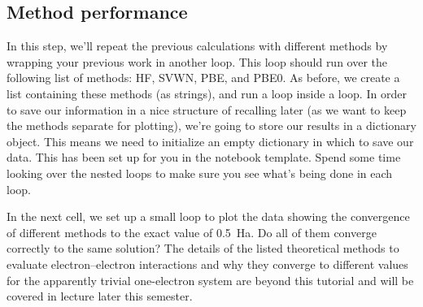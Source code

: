 \subsection*{Method performance}

In this step, we'll repeat the previous calculations with different methods by wrapping your previous work in another loop. This loop should run over the following list of methods: HF, SVWN, PBE, and PBE0. 
As before, we create a list containing these methods (as strings), and run a loop inside a loop. 
In order to save our information in a nice structure of recalling later (as we want to keep the methods separate for plotting), we're going to store our results in a dictionary object. 
This means we need to initialize an empty dictionary in which to save our data. This has been set up for you in the notebook template. 
Spend some time looking over the nested loops to make sure you see what's being done in each loop. 

In the next cell, we set up a small loop to plot the data showing the convergence of different methods to the exact value of \qty{0.5}{Ha}.
Do all of them converge correctly to the same solution? 
The details of the listed theoretical methods to evaluate electron--electron interactions and why they converge to different values for the apparently trivial one-electron system are beyond this tutorial and will be covered in lecture later this semester. 

